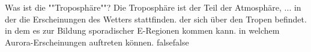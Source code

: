     {Was ist die ""Troposphäre""? Die Troposphäre ist der Teil der Atmosphäre, ...}
    {in der die Erscheinungen des Wetters stattfinden.}
    {der sich über den Tropen befindet.}
    {in dem es zur Bildung sporadischer E-Regionen kommen kann.}
    {in welchem Aurora-Erscheinungen auftreten können.}
    {false}{false}